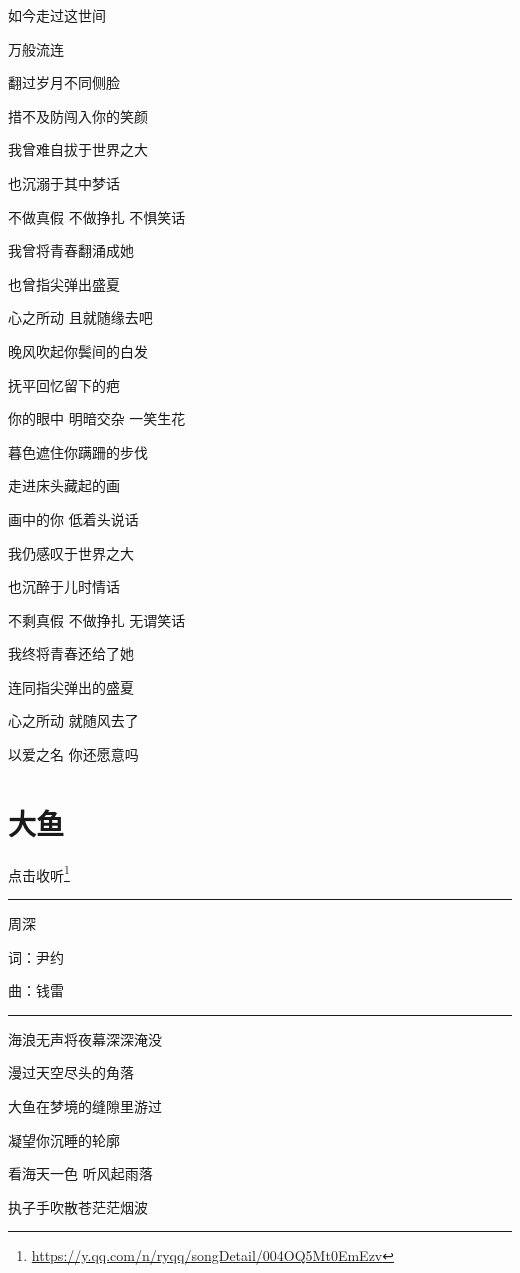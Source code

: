 \documentclass[]{ctexbook}
\renewcommand{\href}[2]{#2\footnote{\url{#1}}}
\begin{document}
如今走过这世间

万般流连

翻过岁月不同侧脸

措不及防闯入你的笑颜

我曾难自拔于世界之大

也沉溺于其中梦话

不做真假 不做挣扎 不惧笑话

我曾将青春翻涌成她

也曾指尖弹出盛夏

心之所动 且就随缘去吧

晚风吹起你鬓间的白发

抚平回忆留下的疤

你的眼中 明暗交杂 一笑生花

暮色遮住你蹒跚的步伐

走进床头藏起的画

画中的你 低着头说话

我仍感叹于世界之大

也沉醉于儿时情话

不剩真假 不做挣扎 无谓笑话

我终将青春还给了她

连同指尖弹出的盛夏

心之所动 就随风去了

以爱之名 你还愿意吗

\section*{大鱼}\label{big-fish}


\href{https://y.qq.com/n/ryqq/songDetail/004OQ5Mt0EmEzv}{点击收听}

\begin{center}\rule{0.5\linewidth}{0.5pt}\end{center}

周深

词：尹约

曲：钱雷

\begin{center}\rule{0.5\linewidth}{0.5pt}\end{center}

海浪无声将夜幕深深淹没

漫过天空尽头的角落

大鱼在梦境的缝隙里游过

凝望你沉睡的轮廓

看海天一色 听风起雨落

执子手吹散苍茫茫烟波
\end{document}
